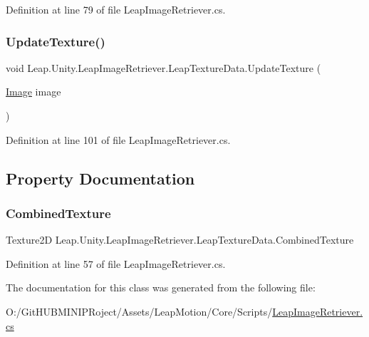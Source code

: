Definition at line 79 of file Leap\+Image\+Retriever.\+cs.

\mbox{\label{class_leap_1_1_unity_1_1_leap_image_retriever_1_1_leap_texture_data_a7a6260ccdc4ca472efb67a37184c6cd3}} 
\subsubsection{\texorpdfstring{UpdateTexture()}{UpdateTexture()}}
{\footnotesize\ttfamily void Leap.\+Unity.\+Leap\+Image\+Retriever.\+Leap\+Texture\+Data.\+Update\+Texture (\begin{DoxyParamCaption}\item[{\mbox{\hyperlink{class_leap_1_1_image}{Image}}}]{image }\end{DoxyParamCaption})}



Definition at line 101 of file Leap\+Image\+Retriever.\+cs.



\subsection{Property Documentation}
\mbox{\label{class_leap_1_1_unity_1_1_leap_image_retriever_1_1_leap_texture_data_ae8cdced92ef3281e951cfa787fd40c80}} 
\subsubsection{\texorpdfstring{CombinedTexture}{CombinedTexture}}
{\footnotesize\ttfamily Texture2D Leap.\+Unity.\+Leap\+Image\+Retriever.\+Leap\+Texture\+Data.\+Combined\+Texture\hspace{0.3cm}{\ttfamily [get]}}



Definition at line 57 of file Leap\+Image\+Retriever.\+cs.



The documentation for this class was generated from the following file\+:\begin{DoxyCompactItemize}
\item 
O\+:/\+Git\+H\+U\+B\+M\+I\+N\+I\+P\+Roject/\+Assets/\+Leap\+Motion/\+Core/\+Scripts/\mbox{\hyperlink{_leap_image_retriever_8cs}{Leap\+Image\+Retriever.\+cs}}\end{DoxyCompactItemize}
